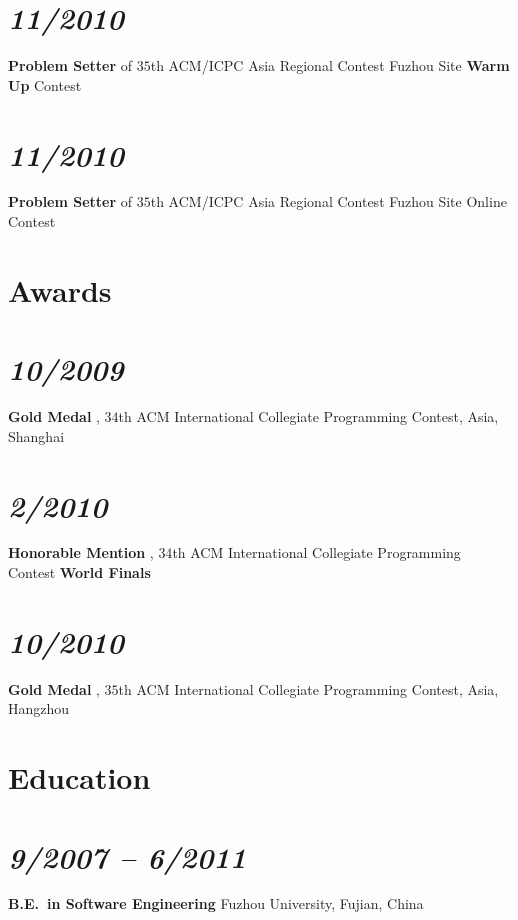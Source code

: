 \documentclass[margin,line]{res}
\newcommand{\ressection}[1]{
    {\colorbox{bg}{\fontfamily{phv}\selectfont\large#1}}
}
\begin{document}
\begin{resume}
\section{\em 11/2010} \textbf{Problem Setter} of $35$th ACM/ICPC Asia Regional Contest Fuzhou Site \textbf{Warm Up} Contest\vspace{-5mm}
\section{\em 11/2010} \textbf{Problem Setter} of $35$th ACM/ICPC Asia Regional Contest Fuzhou Site Online Contest


\section{\ressection{Awards}}
\vspace{5mm}
\section{\em 10/2009} \textbf{Gold Medal} , $34$th ACM International
Collegiate Programming Contest, Asia, Shanghai\vspace{-5mm}

\section{\em 2/2010} \textbf{Honorable Mention} , $34$th ACM International
Collegiate Programming Contest \textbf{World Finals}\vspace{-5mm}

\section{\em 10/2010} \textbf{Gold Medal} , $35$th ACM International
Collegiate Programming Contest, Asia, Hangzhou


\section{\ressection{Education}}

\section{\em 9/2007 -- 6/2011}
\textbf{B.E.\  in Software Engineering} \newline
 Fuzhou University, Fujian, China
 \newline

\end{resume}
\end{document}
